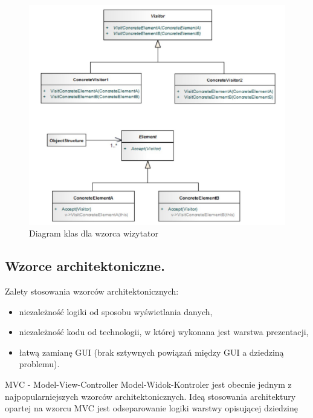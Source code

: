 \documentclass[a4paper,12pt,oneside]{book}
\begin{document}
\begin{itemize}
                    \begin{figure}[h]
                        \centering
                        \includegraphics[width=\textwidth/2]{images/visitor.jpg}
                        \caption{Diagram klas dla wzorca wizytator}
                        \label{fig:twojastara18}
                    \end{figure}
                \end{itemize}
			\newpage\subsection{Wzorce architektoniczne.}
				Zalety stosowania wzorców architektonicznych:
                \begin{itemize}
                    \item niezależność logiki od sposobu wyświetlania danych, 
                    \item niezależność kodu od technologii, w której wykonana jest warstwa 
                    prezentacji, 
                    \item łatwą zamianę GUI (brak sztywnych powiązań między GUI a 
                    dziedziną problemu).
                \end{itemize}
		      MVC - Model-View-Controller
                Model-Widok-Kontroler jest obecnie jednym z najpopularniejszych 
                wzorców architektonicznych. Ideą stosowania architektury opartej na 
                wzorcu MVC jest odseparowanie logiki warstwy opisującej dziedzinę 
\end{document}
